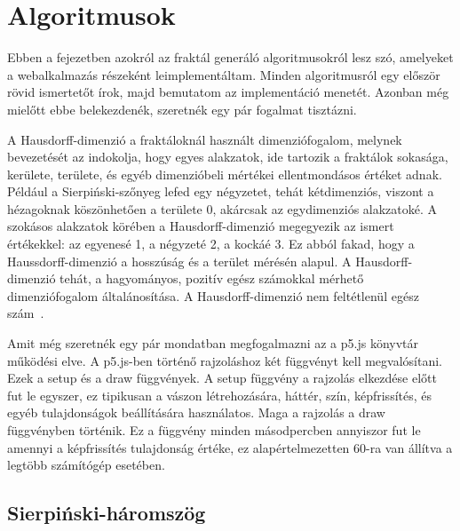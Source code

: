\chapter{Algoritmusok}

Ebben a fejezetben azokról az fraktál generáló algoritmusokról lesz szó, amelyeket a webalkalmazás részeként leimplementáltam. Minden algoritmusról egy először rövid ismertetőt írok, majd bemutatom az implementáció menetét. Azonban még mielőtt ebbe belekezdenék, szeretnék egy pár fogalmat tisztázni.
\par A Hausdorff-dimenzió a fraktáloknál használt dimenziófogalom, melynek bevezetését az indokolja, hogy egyes alakzatok, ide tartozik a fraktálok sokasága, kerülete, területe, és egyéb dimenzióbeli mértékei ellentmondásos értéket adnak. Például a Sierpiński-szőnyeg lefed egy négyzetet, tehát kétdimenziós, viszont a hézagoknak köszönhetően a területe 0, akárcsak az egydimenziós alakzatoké. A szokásos alakzatok körében a Hausdorff-dimenzió megegyezik az ismert értékekkel: az egyenesé 1, a négyzeté 2, a kockáé 3. Ez abból fakad, hogy a Haussdorff-dimenzió a hosszúság és a terület mérésén alapul. A Hausdorff-dimenzió tehát, a hagyományos, pozitív egész számokkal mérhető dimenziófogalom általánosítása. A Hausdorff-dimenzió nem feltétlenül egész szám~\cite{hausdorff}.
\par Amit még szeretnék egy pár mondatban megfogalmazni az a p5.js könyvtár működési elve. A p5.js-ben történő rajzoláshoz két függvényt kell megvalósítani. Ezek a setup és a draw függvények. A setup függvény a rajzolás elkezdése előtt fut le egyszer, ez tipikusan a vászon létrehozására, háttér, szín, képfrissítés, és egyéb tulajdonságok beállítására használatos. Maga a rajzolás a draw függvényben történik. Ez a függvény minden másodpercben annyiszor fut le amennyi a képfrissítés tulajdonság értéke, ez alapértelmezetten 60-ra van állítva a legtöbb számítógép esetében.


\section{Sierpiński-háromszög}

